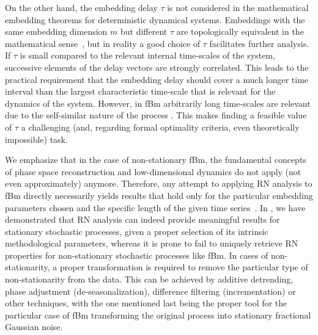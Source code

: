 		On the other hand, the embedding delay $\tau$ is not considered in the mathematical embedding theorems for deterministic dynamical systems. Embeddings with the same embedding dimension $m$ but different $\tau$ are topologically equivalent in the mathematical sense~\cite{kantz1997}, but in reality a good choice of $\tau$ facilitates further analysis. If $\tau$ is small compared to the relevant internal time-scales of the system, successive elements of the delay vectors are strongly correlated. This leads to the practical requirement that the embedding delay should cover a much longer time interval than the largest characteristic time-scale that is relevant for the dynamics of the system. However, in fBm arbitrarily long time-scales are relevant due to the self-similar nature of the process \cite{Zou2015}. This makes finding a feasible value of $\tau$ a challenging (and, regarding formal optimality criteria, even theoretically impossible) task.
		
		We emphasize that in the case of non-stationary fBm, the fundamental concepts of phase space reconstruction and low-dimensional dynamics do not apply (not even approximately) anymore. Therefore, any attempt to applying RN analysis to fBm directly necessarily yields results that hold only for the particular embedding parameters chosen and the specific length of the given time series~\cite{Liu2014}.  In \cite{Zou2015}, we have demonstrated that RN analysis can indeed provide meaningful results for stationary stochastic processes, given a proper selection of its intrinsic methodological parameters, whereas it is prone to fail to uniquely retrieve RN properties for non-stationary stochastic processes like fBm. In cases of non-stationarity, a proper transformation is required to remove the particular type of non-stationarity from the data. This can be achieved by additive detrending, phase adjustment (de-seasonalization), difference filtering (incrementation) or other techniques, with the one mentioned last being the proper tool for the particular case of fBm transforming the original process into stationary fractional Gaussian noise.
		
